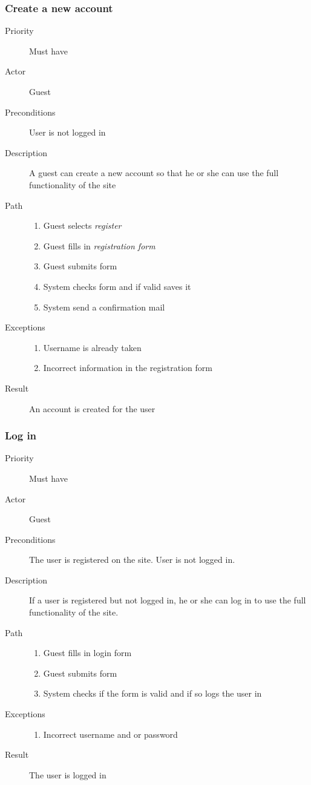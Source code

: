 \documentclass[a4paper, 12pt]{report}
\begin{document}
		\subsubsection{Create a new account}
			\begin{description}
				\item[Priority] Must have
				\item[Actor] Guest
				\item[Preconditions] User is not logged in
				\item[Description]
				A guest can create a new account so that he or she 
				can use the full functionality of the site
 				\item[Path]
 					\begin{enumerate}
						\item Guest selects \emph{register}
						\item Guest fills in \emph{registration form}
						\item Guest submits form
						\item System checks form and if valid saves it
						\item System send a confirmation mail 
					\end{enumerate}
				\item[Exceptions]
					\begin{enumerate}
						\item Username is already taken
						\item Incorrect information in the registration form
					\end{enumerate}
				\item[Result] An account is created for the user
			\end{description}
		\subsubsection{Log in}
			\begin{description}
				\item[Priority] Must have
				\item[Actor] Guest
				\item[Preconditions] The user is registered on the site.
				User is not logged in.
				\item[Description]
				If a user is registered but not logged in, he or she can
				log in to use the full functionality of the site.
				\item[Path]
 					\begin{enumerate}
						\item Guest fills in login form
						\item Guest submits form
						\item System checks if the form is valid and if so logs
						the user in
					\end{enumerate}
				\item[Exceptions]
					\begin{enumerate}
						\item Incorrect username and or password
					\end{enumerate}
				\item[Result] The user is logged in
			\end{description}
\end{document}

